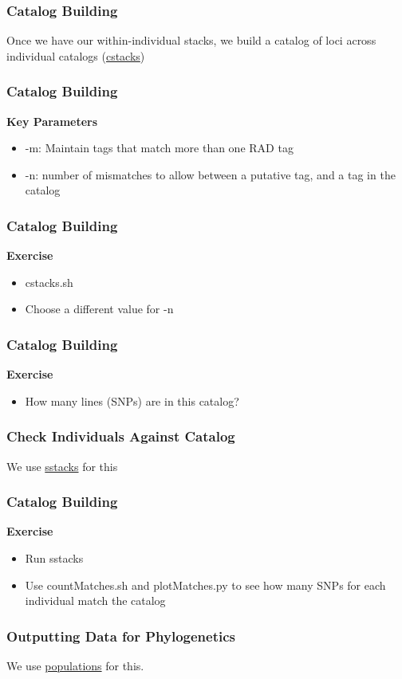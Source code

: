 \documentclass{beamer}
\begin{document}
\begin{frame}
\frametitle{Catalog Building}
Once we have our within-individual stacks, we build a catalog of loci across individual catalogs (\href{http://catchenlab.life.illinois.edu/stacks/comp/cstacks.php}{cstacks})
\end{frame}

\begin{frame}
\frametitle{Catalog Building}
\textbf{Key Parameters}
\begin{itemize}
\item -m: Maintain tags that match more than one RAD tag
\item -n: number of mismatches to allow between a putative tag, and a tag in the catalog
\end{itemize}
\end{frame}

\begin{frame}
\frametitle{Catalog Building}
\textbf{Exercise}
\begin{itemize}
\item cstacks.sh
\item Choose a different value for -n
\end{itemize}
\end{frame}

\begin{frame}
\frametitle{Catalog Building}
\textbf{Exercise}
\begin{itemize}
\item How many lines (SNPs) are in this catalog?
\end{itemize}
\end{frame}

\begin{frame}
\frametitle{Check Individuals Against Catalog}
We use \href{http://catchenlab.life.illinois.edu/stacks/comp/sstacks.php}{sstacks} for this
\end{frame}
\begin{frame}
\frametitle{Catalog Building}
\textbf{Exercise}
\begin{itemize}
\item Run sstacks
\item Use countMatches.sh and plotMatches.py to see how many SNPs for each individual match the catalog
\end{itemize}
\end{frame}

\begin{frame}
\frametitle{Outputting Data for Phylogenetics}
We use \href{http://catchenlab.life.illinois.edu/stacks/comp/populations.php}{populations} for this. 
\end{frame}
\end{document}

